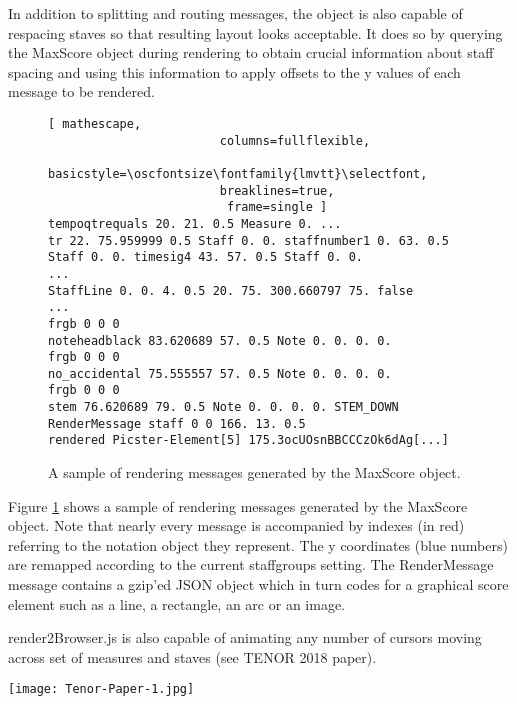 In addition to splitting and routing messages, the object is also capable of respacing staves so that resulting layout looks acceptable. It does so by querying the MaxScore object during rendering to obtain crucial information about staff spacing and using this information to apply offsets to the y values of each message to be rendered.

\begin{figure}[h]
\centering
\begin{lstlisting}[ mathescape,
						columns=fullflexible,
						basicstyle=\oscfontsize\fontfamily{lmvtt}\selectfont,
						breaklines=true,
						 frame=single ]
tempoqtrequals 20. 21. 0.5 Measure 0. ...
tr 22. 75.959999 0.5 Staff 0. 0. staffnumber1 0. 63. 0.5 Staff 0. 0. timesig4 43. 57. 0.5 Staff 0. 0.
...
StaffLine 0. 0. 4. 0.5 20. 75. 300.660797 75. false
...
frgb 0 0 0
noteheadblack 83.620689 57. 0.5 Note 0. 0. 0. 0.
frgb 0 0 0
no_accidental 75.555557 57. 0.5 Note 0. 0. 0. 0.
frgb 0 0 0
stem 76.620689 79. 0.5 Note 0. 0. 0. 0. STEM_DOWN
RenderMessage staff 0 0 166. 13. 0.5 
rendered Picster-Element[5] 175.3ocUOsnBBCCCzOk6dAg[...]
\end{lstlisting}

\caption{A sample of rendering messages generated by the MaxScore object. 
\label{fig:maxscore-mesages}}
\end{figure}

Figure \ref{fig:maxscore-mesages} shows a sample of rendering messages generated by the MaxScore object. Note that nearly every message is accompanied by indexes (in red) referring to the notation object they represent. The y coordinates (blue numbers) are remapped according to the current staffgroups setting. The RenderMessage message contains a gzip’ed JSON object which in turn codes for a graphical score element such as a line, a rectangle, an arc or an image.

render2Browser.js is also capable of animating any number of cursors moving across set of measures and staves (see TENOR 2018 paper).

\begin{figure*}[h]
    \centering
    \begin{minipage}{1.\textwidth}
        \centering
        \texttt{[image: Tenor-Paper-1.jpg]} 
       	\caption{A MaxScore score with 4 staves (top) rendered dynamically in four browser windows (center and bottom). The staves are split and grouped by render2Browser.js according to the following staffgroup settings: 0 1-2 2 0+3.
\label{fig:Tenor-Paper-1}}
    \end{minipage}
\end{figure*}


